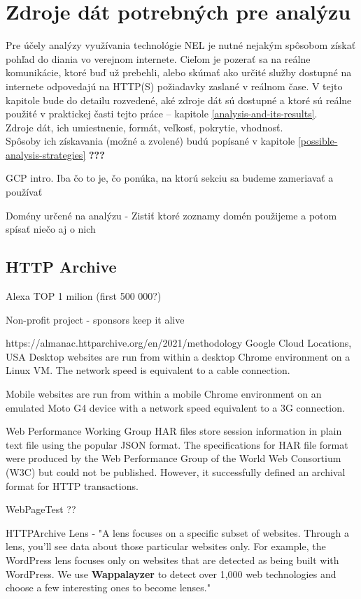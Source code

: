 \chapter{Zdroje dát potrebných pre analýzu}
\label{data-sources-available-for-research}

Pre účely analýzy využívania technológie NEL je nutné nejakým spôsobom získať pohľad do diania vo verejnom internete.
Cieľom je pozerať sa na reálne komunikácie, ktoré buď už prebehli, alebo skúmať ako určité služby dostupné na internete
odpovedajú na HTTP(S) požiadavky zaslané v reálnom čase. V tejto kapitole bude do detailu rozvedené, aké zdroje dát sú dostupné a ktoré sú reálne
použité v praktickej časti tejto práce -- kapitole \ref{analysis-and-its-results}.
\\
Zdroje dát, ich umiestnenie, formát, veľkosť, pokrytie, vhodnosť.
\\
Spôsoby ich získavania (možné a zvolené) budú popísané v kapitole \ref{possible-analysis-strategies} \textbf{???}

GCP intro. Iba čo to je, čo ponúka, na ktorú sekciu sa budeme zameriavať a používať

Domény určené na analýzu - Zistiť ktoré zoznamy domén použijeme a potom spísať niečo aj o nich

\section{HTTP Archive}

Alexa TOP 1 milion (first 500 000?)

Non-profit project - sponsors keep it alive

https://almanac.httparchive.org/en/2021/methodology
Google Cloud Locations, USA
Desktop websites are run from within a desktop Chrome environment on a Linux VM. The network speed is equivalent to a cable connection.

Mobile websites are run from within a mobile Chrome environment on an emulated Moto G4 device with a network speed equivalent to a 3G connection.

Web Performance Working Group
HAR files store session information in plain text file using the popular JSON format. The specifications for HAR file format were produced by the Web Performance Group of the World Web Consortium (W3C) but could not be published. However, it successfully defined an archival format for HTTP transactions.

WebPageTest ??

HTTPArchive Lens - "A lens focuses on a specific subset of websites. Through a lens, you'll see data about those particular websites only. For example, the WordPress lens focuses only on websites that are detected as being built with WordPress. We use \textbf{Wappalayzer} to detect over 1,000 web technologies and choose a few interesting ones to become lenses."

